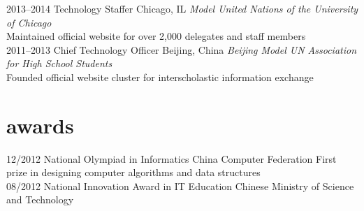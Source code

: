 \documentclass[]{friggeri-cv} %
\begin{document}
\begin{entrylist}
\entry
{2013--2014}
{Technology Staffer}
{Chicago, IL}
{\emph{Model United Nations of the University of Chicago} \\
Maintained official website for over 2,000 delegates and staff members \\}
\entry
{2011--2013}
{Chief Technology Officer}
{Beijing, China}
{\emph{Beijing Model UN Association for High School Students} \\
Founded official website cluster for interscholastic information exchange}
\end{entrylist}


\section{awards}

\begin{entrylist}
\entry
{12/2012}
{National Olympiad in Informatics}
{China Computer Federation}
{First prize in designing computer algorithms and data structures\\}
\entry
{08/2012}
{National Innovation Award in IT Education}
{Chinese Ministry of Science and Technology}
{}
\end{entrylist}
\end{document}
